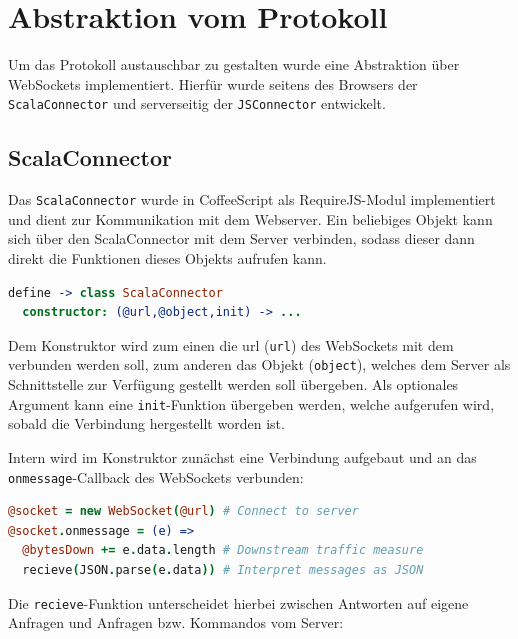 \section{Abstraktion vom Protokoll}
\label{sec:jsc}

Um das Protokoll austauschbar zu gestalten wurde eine Abstraktion über WebSockets implementiert.
Hierfür wurde seitens des Browsers der \texttt{ScalaConnector} und serverseitig der
\texttt{JSConnector} entwickelt.

\subsection{ScalaConnector}

Das \texttt{ScalaConnector} wurde in CoffeeScript als RequireJS-Modul implementiert und dient zur
Kommunikation mit dem Webserver. Ein beliebiges Objekt kann sich über den ScalaConnector mit dem
Server verbinden, sodass dieser dann direkt die Funktionen dieses Objekts aufrufen kann.

\begin{lstlisting}[language=coffee]
define -> class ScalaConnector
  constructor: (@url,@object,init) -> ...
\end{lstlisting}

Dem Konstruktor wird zum einen die url (\texttt{url}) des WebSockets mit dem verbunden werden soll,
zum anderen das Objekt (\texttt{object}), welches dem Server als Schnittstelle zur Verfügung
gestellt werden soll übergeben. Als optionales Argument kann eine \texttt{init}-Funktion übergeben
werden, welche aufgerufen wird, sobald die Verbindung hergestellt worden ist.

Intern wird im Konstruktor zunächst eine Verbindung aufgebaut und an das
\texttt{onmessage}-Callback des WebSockets verbunden:

\begin{lstlisting}[language=coffee]
@socket = new WebSocket(@url) # Connect to server
@socket.onmessage = (e) =>    
  @bytesDown += e.data.length # Downstream traffic measure
  recieve(JSON.parse(e.data)) # Interpret messages as JSON
\end{lstlisting}

Die \texttt{recieve}-Funktion unterscheidet hierbei zwischen Antworten auf eigene Anfragen und
Anfragen bzw. Kommandos vom Server:

